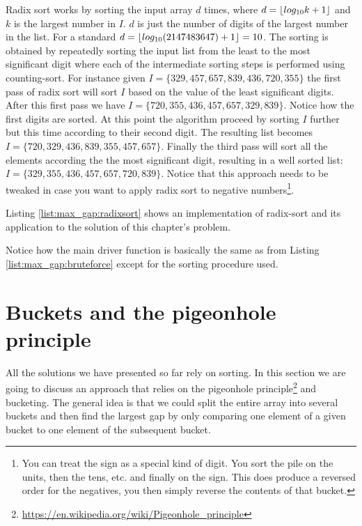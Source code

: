 Radix sort works by sorting the input array $d$ times, where $d = \lfloor log_{10}k+1\rfloor$ and $k$ is
the largest number in $I$. $d$ is just the number of digits of the largest number in the list. For a
standard  $d=\lfloor log_{10}(2147483647) + 1\rfloor=10$. The sorting is obtained by repeatedly
sorting the input list from the least to the most significant digit where each of the intermediate
sorting steps is performed using counting-sort. For instance given $I =
\{329,457,657,839,436,720,355\}$ the first pass of radix sort will sort $I$ based on the value of
the least significant digits. After this first pass we have $I=\{720,355,436,457,657,329,839\}$.
Notice how the first digits are sorted. At this point the algorithm proceed by sorting $I$ further
but this time according to their second digit. The resulting list becomes
$I=\{720,329,436,839,355,457,657\}$. Finally the third pass will sort all the elements according the
the most significant digit, resulting in a well sorted list: $I=\{329,355,436,457,657,720,839\}$.
Notice that this approach needs to be tweaked in case you want to apply radix sort to negative
numbers\footnote{You can treat the sign as a special kind of digit. You sort the pile on the units,
then the tens, etc. and finally on the sign. This does produce a reversed order for the negatives,
you then simply reverse the contents of that bucket.}.

Listing \ref{list:max_gap:radixsort} shows an implementation of radix-sort and its application to
the solution of this chapter's problem.

Notice how the main driver function  is basically the same as
 from Listing \ref{list:max_gap:bruteforce} except for the sorting
procedure used.

\section{Buckets and the pigeonhole principle}
\label{max_gap:sec:buckets}
All the solutions we have presented so far rely on sorting. In this section we are going to discuss
an approach that relies on  the pigeonhole
principle\footnote{\url{https://en.wikipedia.org/wiki/Pigeonhole_principle}} and bucketing. The
general idea is that we could split the entire array into several buckets and then find the largest
gap by only comparing one element of a given bucket to one element of the subsequent bucket. 


